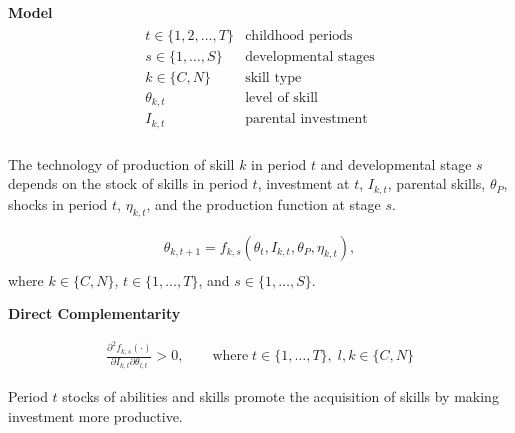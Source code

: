 \begin{frame}
\textbf{Model}
\begin{align*}\begin{array}{ll}
t\in\{1, 2, \hdots, T\} & \text{childhood periods} \\
s\in\{1, \hdots, S\}    & \text{developmental stages}  \\
k \in\{C, N\}          & \text{skill type} \\
\theta_{k,t}           & \text{level of skill} \\
I_{k,t}                 & \text{parental investment} \\
\end{array}\end{align*}
\end{frame}
\begin{frame}
The technology of production of skill $k$ in period $t$ and developmental stage $s$ depends on the stock of skills in period $t$, investment at $t$, $I_{k,t}$, parental skills, $\theta_P$, shocks in period $t$, $\eta_{k, t}$, and the
production function at stage $s$.

\begin{align*}
\theta_{k, t + 1} = f_{k, s}(\theta_t, I_{k, t}, \theta_P, \eta_{k, t}), \\
\end{align*}
where $k\in\{C, N\}$, $t\in\{1, \hdots, T\}$, and $s\in\{1, \hdots, S\}$.

\end{frame}
\begin{frame}\textbf{Direct Complementarity}

\begin{align*}
\frac{\partial^2 f_{k, s}(\cdot)}{\partial I_{k, t}\partial \theta_{l, t}} > 0, \qquad\text{where}\;t\in\{1,\hdots,T\}, \; l,k\in\{C, N\}
\end{align*}

Period $t$ stocks of abilities and skills promote the acquisition of skills by making investment more productive.

\end{frame}
